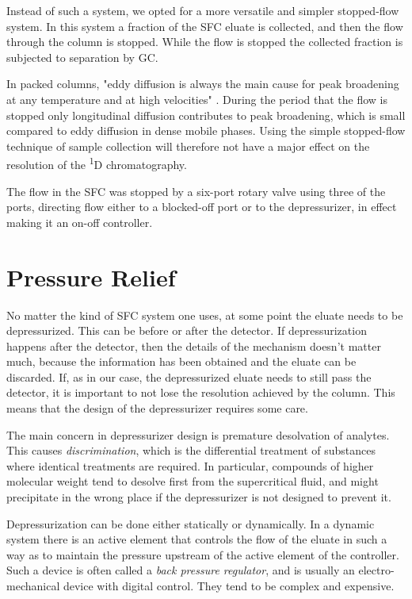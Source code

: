 Instead of such a system, we opted for a more versatile and simpler stopped-flow
system. In this system a fraction of the SFC eluate is collected, and then the
flow through the column is stopped. While the flow is stopped the collected
fraction is subjected to separation by GC.

In packed columns, "eddy diffusion is always the main cause for peak broadening
at any temperature and at high velocities" \autocite{Gritti2006}. During the
period that the flow is stopped only longitudinal diffusion contributes to peak
broadening, which is small compared to eddy diffusion in dense mobile phases.
Using the simple stopped-flow technique of sample collection will therefore not
have a major effect on the resolution of the \textsuperscript{1}D
chromatography.

The flow in the SFC was stopped by a six-port rotary valve using three of the ports,
directing flow either to a blocked-off port or to the depressurizer, in effect
making it an on-off controller.

\section{Pressure Relief}

No matter the kind of SFC system one uses, at some point the eluate needs to be
depressurized. This can be before or after the detector. If depressurization
happens after the detector, then the details of the mechanism doesn't matter
much, because the information has been obtained and the eluate can be
discarded. If, as in our case, the depressurized eluate needs to still pass the
detector, it is important to not lose the resolution achieved by the column.
This means that the design of the depressurizer requires some care.

The main concern in depressurizer design is premature desolvation of analytes.
This causes \textit{discrimination}, which is the differential treatment of
substances where identical treatments are required. In particular, compounds of
higher molecular weight tend to desolve first from the supercritical fluid, and
might precipitate in the wrong place if the depressurizer is not designed to
prevent it. 

Depressurization can be done either statically or dynamically. In a dynamic
system there is an active element that controls the flow of the eluate in such a
way as to maintain the pressure upstream of the active element of the
controller. Such a device is often called a \textit{back pressure regulator},
and is usually an electro-mechanical device with digital control. They tend to
be complex and expensive.

